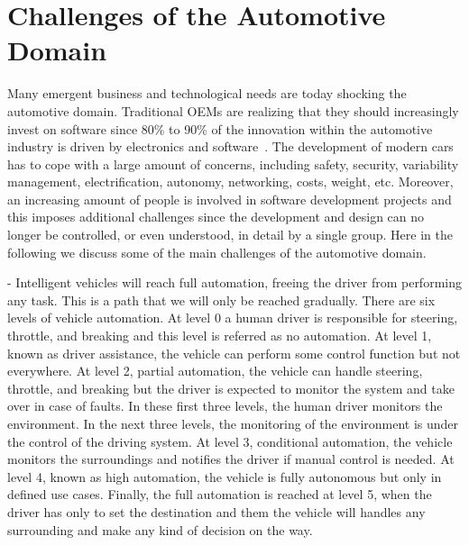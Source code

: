 \section{Challenges of the Automotive Domain}\label{sec:challenges}

Many emergent business and technological needs are today shocking the automotive domain. Traditional OEMs are realizing that they should increasingly invest on software since 80\% to 90\% of the innovation within the automotive industry
is driven by electronics and software~\cite{softwareAutomotive}. The development of modern cars has to cope with a large amount of concerns, including safety, security, variability management, electrification, autonomy, networking, costs, weight, etc. Moreover, an increasing amount of people is involved in software development projects and this imposes additional challenges since the development and design can no longer be controlled, or even understood, in detail by
a single group. Here in the following we discuss some of the main challenges of the automotive domain.

 -
Intelligent vehicles will reach full automation, freeing the driver from performing
any task. This is a path that we will only be reached gradually. There are six levels
of vehicle automation. At level 0 a human driver is responsible for steering, throttle, and breaking and this level is referred as no automation. 
At level 1, known as driver assistance, the vehicle can perform some control function but not everywhere. At level 2, partial automation, the vehicle can handle steering, throttle, and breaking but the driver
is expected to monitor the system and take over in case of faults. In these first three levels, the human driver
monitors the environment. In the next three levels, the monitoring of the environment is under the control of the driving system. At level 3, conditional automation, the vehicle monitors the surroundings and notifies the driver if manual control is needed. At level 4, known as high automation, the vehicle is fully autonomous but only in defined use cases. Finally, the full automation is reached at level 5, when the driver has only to set the destination and them the vehicle will handles any surrounding and make any kind of decision on the way.

